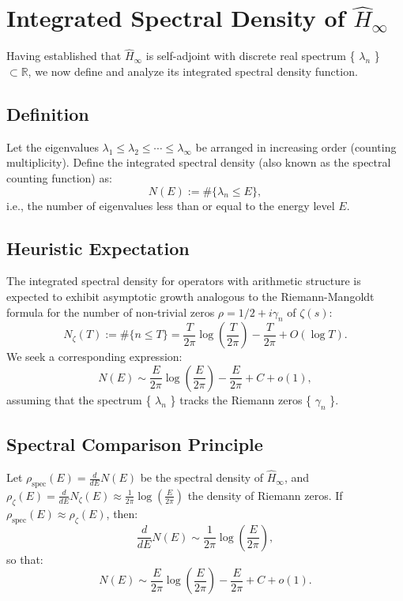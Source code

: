 \section{Integrated Spectral Density of \( \hat{H}_\infty \)}
Having established that \( \hat{H}_\infty \) is self-adjoint with discrete real spectrum \{ \(\lambda_n\) \} \( \subset \mathbb{R} \), we now define and analyze its integrated spectral density function.

\subsection*{Definition}
Let the eigenvalues \( \lambda_1 \leq \lambda_2 \leq \cdots \leq \lambda_\infty \) be arranged in increasing order (counting multiplicity). Define the integrated spectral density (also known as the spectral counting function) as:
\[
N(E) := \# \{ \lambda_n \leq E \},
\]
i.e., the number of eigenvalues less than or equal to the energy level \( E \).

\subsection*{Heuristic Expectation}
The integrated spectral density for operators with arithmetic structure is expected to exhibit asymptotic growth analogous to the Riemann-Mangoldt formula for the number of non-trivial zeros \( \rho = 1/2 + i \gamma_n \) of \( \zeta(s) \):
\[
N_\zeta(T) := \# \{ n \leq T \} = \frac{T}{2\pi} \log \left( \frac{T}{2\pi} \right) - \frac{T}{2\pi} + O(\log T).
\]
We seek a corresponding expression:
\[
N(E) \sim \frac{E}{2\pi} \log \left( \frac{E}{2\pi} \right) - \frac{E}{2\pi} + C + o(1),
\]
assuming that the spectrum \{ \(\lambda_n\) \} tracks the Riemann zeros \{ \(\gamma_n\) \}.

\subsection*{Spectral Comparison Principle}
Let \( \rho_{\text{spec}}(E) = \frac{d}{dE} N(E) \) be the spectral density of \( \hat{H}_\infty \), and \( \rho_\zeta(E) = \frac{d}{dE} N_\zeta(E) \approx \frac{1}{2\pi} \log \left( \frac{E}{2\pi} \right) \) the density of Riemann zeros. If \( \rho_{\text{spec}}(E) \approx \rho_\zeta(E) \), then:
\[
\frac{d}{dE} N(E) \sim \frac{1}{2\pi} \log \left( \frac{E}{2\pi} \right),
\]
so that:
\[
N(E) \sim \frac{E}{2\pi} \log \left( \frac{E}{2\pi} \right) - \frac{E}{2\pi} + C + o(1).
\]

